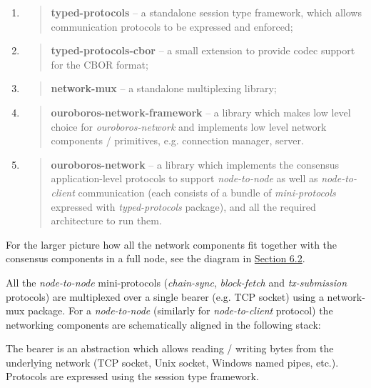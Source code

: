 \documentclass[11pt,a4paper]{article}
\begin{document}
\begin{enumerate}
\def\labelenumi{\arabic{enumi}.}
\item
  \begin{quote}
  \textbf{typed-protocols} -- a standalone session type framework, which
  allows communication protocols to be expressed and enforced;
  \end{quote}
\item
  \begin{quote}
  \textbf{typed-protocols-cbor} -- a small extension to provide codec
  support for the CBOR format;
  \end{quote}
\item
  \begin{quote}
  \textbf{network-mux} -- a standalone multiplexing library;
  \end{quote}
\item
  \begin{quote}
  \textbf{ouroboros-network-framework} -- a library which makes low
  level choice for \emph{ouroboros-network} and implements low level
  network components / primitives, e.g. connection manager, server.
  \end{quote}
\item
  \begin{quote}
  \textbf{ouroboros-network} -- a library which implements the consensus
  application-level protocols to support \emph{node-to-node} as well as
  \emph{node-to-client} communication (each consists of a bundle of
  \emph{mini-protocols} expressed with \emph{typed-protocols} package),
  and all the required architecture to run them.
  \end{quote}
\end{enumerate}

For the larger picture how all the network components fit together with
the consensus components in a full node, see the diagram in
\protect\hyperlink{consensus-components}{{Section 6.2}}.

All the \emph{node-to-node} mini-protocols (\emph{chain-sync},
\emph{block-fetch} and \emph{tx-submission} protocols) are multiplexed
over a single bearer (e.g. TCP socket) using a network-mux package. For
a \emph{node-to-node} (similarly for \emph{node-to-client} protocol) the
networking components are schematically aligned in the following stack:

The bearer is an abstraction which allows reading / writing bytes from
the underlying network (TCP socket, Unix socket, Windows named pipes,
etc.). Protocols are expressed using the session type framework.
\end{document}
